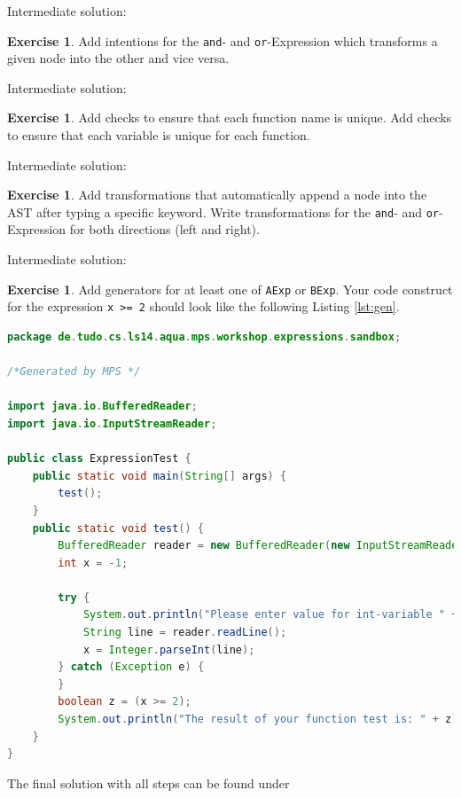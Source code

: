 \documentclass[a4paper,oneside,DIV8,10pt]{scrartcl}
\theoremstyle{definition}
\newtheorem{aufgabe}[satz]{Exercise}
\begin{document}
	Intermediate solution: 
	
	\begin{aufgabe}
		Add intentions for the \texttt{and}- and \texttt{or}-Expression which transforms a given node into the other and vice versa.
	\end{aufgabe}

	Intermediate solution: 
	
	\begin{aufgabe}
	Add checks to ensure that each function name is unique. Add checks to ensure that each variable is unique for each function.
	\end{aufgabe}

	Intermediate solution: 
	
	\begin{aufgabe}
	Add transformations that automatically append a node into the AST after typing a specific keyword. Write transformations for the \texttt{and}- and \texttt{or}-Expression for both directions (left and right).
	\end{aufgabe}

	Intermediate solution: 
	
	\begin{aufgabe}
		Add generators for at least one of \texttt{AExp} or \texttt{BExp}. Your code construct for the expression \texttt{x >= 2} should look like the following  Listing \ref{lst:gen}. \newpage
		
		\begin{lstlisting}[language=Java,caption={Generated Java code that parses the variables and returns the result of the defined expression}, captionpos=b, label={lst:gen}]
package de.tudo.cs.ls14.aqua.mps.workshop.expressions.sandbox;

/*Generated by MPS */

import java.io.BufferedReader;
import java.io.InputStreamReader;

public class ExpressionTest {
	public static void main(String[] args) {
		test();
	}
	public static void test() {
		BufferedReader reader = new BufferedReader(new InputStreamReader(System.in));
		int x = -1;
		
		try {
			System.out.println("Please enter value for int-variable " + "x");
			String line = reader.readLine();
			x = Integer.parseInt(line);
		} catch (Exception e) {
		}
		boolean z = (x >= 2);
		System.out.println("The result of your function test is: " + z);
	}
}
		\end{lstlisting}
	\end{aufgabe}

	The final solution with all steps can be found under 


\end{document}
